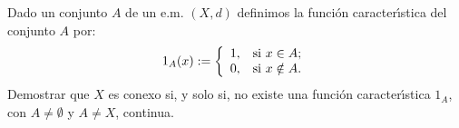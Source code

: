 \begin{ejercicio} Dado un conjunto $A$ de un e.m. $(X,d)$
definimos la funci\'on caracter\'{\i}stica del conjunto $A$ por:
\[
    1_A(x):=\left\{%
\begin{array}{ll}
    1, & \hbox{si $x\in A$;} \\
    0, & \hbox{si $x\notin A$.} \\
\end{array}%
\right.
\]
Demostrar que $X$ es conexo si, y solo si, no existe una funci\'on
caracter\'{\i}stica $1_A$, con $A\neq\emptyset$ y $A\neq X$,
continua.
\end{ejercicio}
